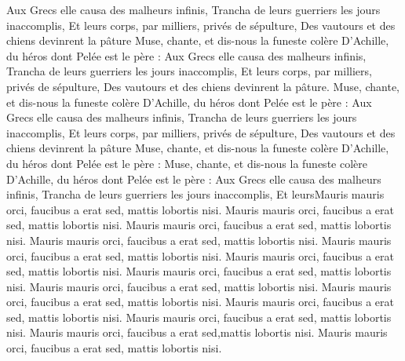 \documentclass{article}
\begin{document}
{{Aux Grecs elle causa des malheurs infinis,
Trancha de leurs guerriers les jours inaccomplis,
Et leurs corps, par milliers, privés de sépulture,
Des vautours et des chiens devinrent la pâture
Muse, chante, et dis-nous la funeste colère
D'Achille, du héros dont Pelée est le père :
Aux Grecs elle causa des malheurs infinis,
Trancha de leurs guerriers les jours inaccomplis,
Et leurs corps, par milliers, privés de sépulture,
Des vautours et des chiens devinrent la pâture.
Muse, chante, et dis-nous la funeste colère
D'Achille, du héros dont Pelée est le père :
Aux Grecs elle causa des malheurs infinis,
Trancha de leurs guerriers les jours inaccomplis,
Et leurs corps, par milliers, privés de sépulture,
Des vautours et des chiens devinrent la pâture
Muse, chante, et dis-nous la funeste colère
D'Achille, du héros dont Pelée est le père :
Muse, chante, et dis-nous la funeste colère
D'Achille, du héros dont Pelée est le père :
Aux Grecs elle causa des malheurs infinis,
Trancha de leurs guerriers les jours inaccomplis,
Et leurs}}Mauris mauris orci, faucibus a erat sed, mattis lobortis nisi.  Mauris mauris orci, faucibus a erat sed, mattis lobortis nisi.  Mauris mauris orci, faucibus a erat sed, mattis lobortis nisi.  Mauris mauris orci, faucibus a erat sed, mattis lobortis nisi.  Mauris mauris orci, faucibus a erat sed, mattis lobortis nisi.  Mauris mauris orci, faucibus a erat sed, mattis lobortis nisi.  Mauris mauris orci, faucibus a erat sed, mattis lobortis nisi.  Mauris mauris orci, faucibus a erat sed, mattis lobortis nisi.  Mauris mauris orci, faucibus a erat sed, mattis lobortis nisi.  Mauris mauris orci, faucibus a erat sed, mattis lobortis nisi.  Mauris mauris orci, faucibus a erat sed, mattis lobortis nisi. Mauris mauris orci, faucibus a erat sed,mattis lobortis nisi. 
 Mauris mauris orci, faucibus a erat sed, mattis lobortis nisi.

\pend
\endnumbering
\end{document}

